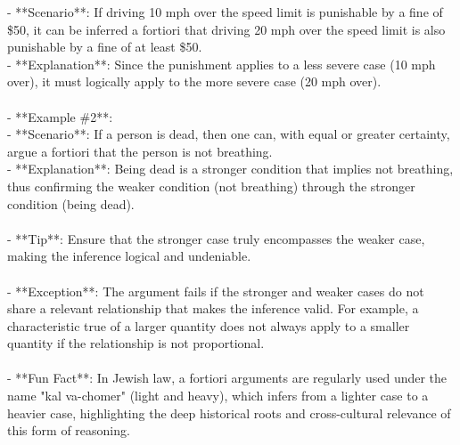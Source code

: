 \documentclass[a4paper,12pt,single,pdftex]{scrartcl}
\begin{document}
{    
        - **Scenario**: If driving 10 mph over the speed limit is punishable by a fine of \$50, it can be inferred a fortiori that driving 20 mph over the speed limit is also punishable by a fine of at least \$50.
    \\

    
        - **Explanation**: Since the punishment applies to a less severe case (10 mph over), it must logically apply to the more severe case (20 mph over).
    \\

    
      
    \\

    
      - **Example \#2**:
    \\

    
        - **Scenario**: If a person is dead, then one can, with equal or greater certainty, argue a fortiori that the person is not breathing.
    \\

    
        - **Explanation**: Being dead is a stronger condition that implies not breathing, thus confirming the weaker condition (not breathing) through the stronger condition (being dead).
    \\

    
      
    \\

    
      - **Tip**: Ensure that the stronger case truly encompasses the weaker case, making the inference logical and undeniable.
    \\

    
      
    \\

    
      - **Exception**: The argument fails if the stronger and weaker cases do not share a relevant relationship that makes the inference valid. For example, a characteristic true of a larger quantity does not always apply to a smaller quantity if the relationship is not proportional.
    \\

    
      
    \\

    
      - **Fun Fact**: In Jewish law, a fortiori arguments are regularly used under the name "kal va-chomer" (light and heavy), which infers from a lighter case to a heavier case, highlighting the deep historical roots and cross-cultural relevance of this form of reasoning.
    \\

  }
\end{document}
